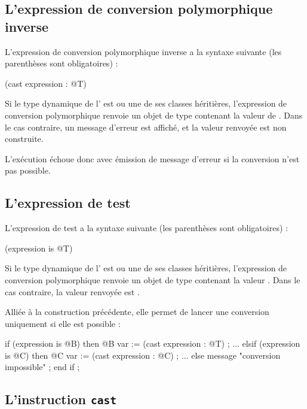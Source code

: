 \subsection{L'expression de conversion polymorphique inverse}

L'expression de conversion polymorphique inverse a la syntaxe suivante (les parenthèses sont obligatoires) :

\begin{galgascode}
(cast expression : @T)
\end{galgascode}

Si le type dynamique de l' est  ou une de ses classes héritières, l'expression de conversion polymorphique renvoie un objet de type  contenant la valeur de . Dans le cas contraire, un message d'erreur est affiché, et la valeur renvoyée est non construite.

L'exécution échoue donc avec émission de message d'erreur si la conversion n'est pas possible. 

\subsection{L'expression de test}

L'expression de test a la syntaxe suivante (les parenthèses sont obligatoires) :

\begin{galgascode}
(expression is @T)
\end{galgascode}

Si le type dynamique de l'  est  ou une de ses classes héritières, l'expression de conversion polymorphique renvoie un objet de type  contenant la valeur . Dans le cas contraire, la valeur renvoyée est .

Alliée à la construction précédente, elle permet de lancer une conversion uniquement si elle est possible :

\begin{galgascode}
if (expression is @B) then
  @B var := (cast expression : @T) ;
  ...
elsif (expression is @C) then
  @C var := (cast expression : @C) ;
  ...
else
  message "conversion impossible" ;
end if ;
\end{galgascode}

\subsection{L'instruction \texttt{cast}}

